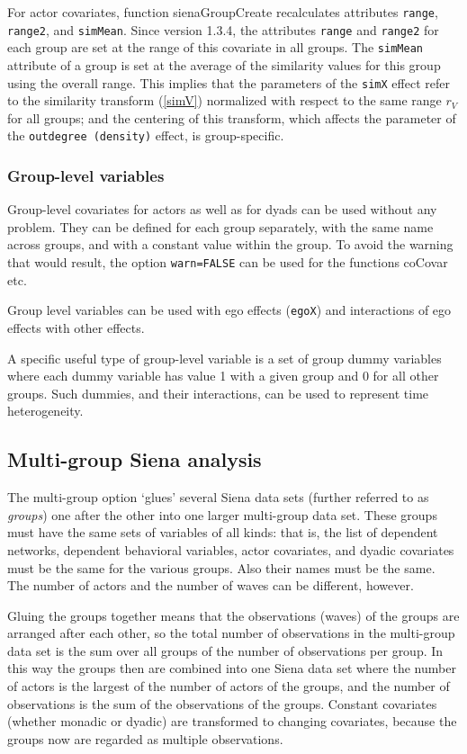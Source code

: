 \documentclass[a4paper,fleqn,11pt]{article}
\newcommand{\+}{\, + \,}
\newcommand{\sfn}[1]{\textsf{#1}}
\begin{document}
For actor covariates, function \textsf{sienaGroupCreate} recalculates
attributes \texttt{range}, \texttt{range2}, and \texttt{simMean}.
Since version 1.3.4,
the attributes \texttt{range} and \texttt{range2} for each group are set
at the range of this covariate in all groups.
The \texttt{simMean} attribute
of a group is set at the average of the similarity values
for this group using the overall range.
This implies that the parameters of the \texttt{simX} effect refer
to the similarity transform (\ref{simV})
normalized with respect to the same range
$r_V$ for all groups; and the centering of this transform,
which affects the parameter of the \texttt{outdegree (density)} effect,
is group-specific.

\subsubsection{Group-level variables}

Group-level covariates for actors as well as for
dyads can be used without any problem. They can be defined for each
group separately, with the same name across groups,
and with a constant value within the group.
To avoid the warning that would result, the option \texttt{warn=FALSE}
can be used for the functions \sfn{coCovar} etc.

Group level variables can be used with ego effects (\texttt{egoX})
and interactions of ego effects with other effects.

A specific useful type of group-level variable is a set of group dummy
variables where each dummy variable has value 1 with a given group and
0 for all other groups.
Such dummies, and their interactions,
can be used to represent time heterogeneity.


\subsection{Multi-group Siena analysis}
\label{S_multigroup}

The multi-group option `glues' several Siena data sets
(further referred to as \emph{groups}) one after the other
into one larger multi-group data set.
These groups must have the same sets of variables of all kinds:
that is, the list of dependent networks, dependent behavioral variables,
actor covariates, and dyadic covariates must be the same
for the various groups.
Also their names must be the same.
The number of actors and the number of waves can be different, however.

Gluing the groups together means that the observations (waves) of the groups
are arranged after each other, so the total number of observations
in the multi-group data set is the sum over all groups of the
number of observations per group. In this way
the groups then are combined into one Siena data set
where the number of actors is the largest of the number of
actors of the groups, and the number of observations
is the sum of the observations of the groups.
Constant covariates (whether monadic or dyadic) are transformed
to changing covariates, because the groups now are regarded
as multiple observations.
\end{document}
